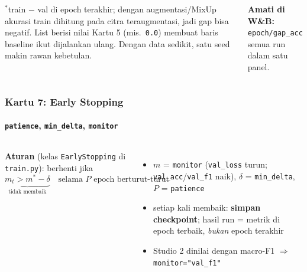 \documentclass[t,aspectratio=169,xcolor={dvipsnames,table}]{beamer}
\begin{document}
\begin{frame}
\begin{columns}[T]
        \vspace{0.12cm}
        {\scriptsize $^{*}$train $-$ val di epoch terakhir; dengan augmentasi/MixUp akurasi train dihitung pada citra teraugmentasi, jadi gap bisa negatif. List berisi nilai Kartu 5 (mis.\ \texttt{0.0}) membuat baris baseline ikut dijalankan ulang. Dengan data sedikit, satu seed makin rawan kebetulan.}

        \vspace{0.1cm}
        {\scriptsize\color{dlMute} \textbf{Amati di W\&B:} \texttt{epoch/gap\_acc} semua run dalam satu panel.}
    \end{columns}
\end{frame}

\begin{frame}
    \frametitle{Kartu 7: Early Stopping}
    \framesubtitle{\texttt{patience}, \texttt{min\_delta}, \texttt{monitor}}
    \footnotesize

    \begin{columns}[T]
        \textbf{Aturan} (kelas \texttt{EarlyStopping} di \texttt{train.py}): berhenti jika
        \[
            \underbrace{m_t > m^{*} - \delta}_{\text{tidak membaik}} \quad \text{selama } P \text{ epoch berturut-turut}
        \]
        \begin{itemize}
            \item $m$ = \texttt{monitor} (\texttt{val\_loss} turun; \texttt{val\_acc}/\texttt{val\_f1} naik), $\delta$ = \texttt{min\_delta}, $P$ = \texttt{patience}
            \item setiap kali membaik: \textbf{simpan checkpoint}; hasil run = metrik di epoch terbaik, \emph{bukan} epoch terakhir
            \item Studio 2 dinilai dengan macro-F1 $\Rightarrow$ \texttt{monitor="val\_f1"}
        \end{itemize}


\end{columns}
\end{frame}
\end{document}
